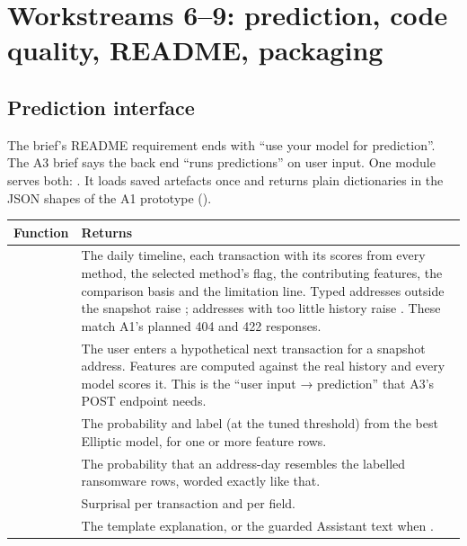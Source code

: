 \section{Workstreams 6--9: prediction, code quality, README, packaging}
\label{sec:code}

\subsection{Prediction interface}
\label{sec:predict}

The brief's README requirement ends with ``use your model for prediction''. The A3 brief says the
back end ``runs predictions'' on user input. One module serves both: .
It loads saved artefacts once and returns plain dictionaries in the JSON shapes of the A1
prototype ().

\begin{center}
\small
\begin{tabularx}{\textwidth}{@{}L{5.2cm}Y@{}}
\toprule
\textbf{Function} & \textbf{Returns} \\
\midrule
{} & The daily timeline, each transaction with its scores from every method, the selected method's flag, the contributing features, the comparison basis and the limitation line. Typed addresses outside the snapshot raise ; addresses with too little history raise . These match A1's planned 404 and 422 responses. \\
 & The user enters a hypothetical next transaction for a snapshot address. Features are computed against the real history and every model scores it. This is the ``user input → prediction'' that A3's POST endpoint needs. \\
 & The probability and label (at the tuned threshold) from the best Elliptic model, for one or more feature rows. \\
 & The probability that an address-day resembles the labelled ransomware rows, worded exactly like that. \\
 & Surprisal per transaction and per field. \\
 & The template explanation, or the guarded Assistant text when . \\
\bottomrule
\end{tabularx}
\end{center}

